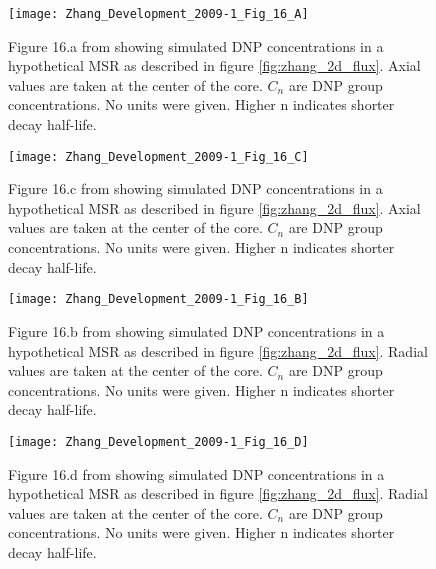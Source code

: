 \documentclass[review]{elsarticle}
\begin{document}
\begin{figure}[h]
   \centering
   \texttt{[image: Zhang\_Development\_2009-1\_Fig\_16\_A]}
   \caption{Figure 16.a from \cite{zhang_development_2009-1} showing simulated DNP concentrations
               in a hypothetical MSR as described in figure \ref{fig:zhang_2d_flux}.
               Axial
               values are taken at the center of the core. $C_{n}$ are DNP
               group concentrations. No units were given. Higher n indicates
               shorter decay half-life.}
   \label{fig:zhang_axial_velocity_dnp_1}
\end{figure}

\begin{figure}[h]
   \centering
   \texttt{[image: Zhang\_Development\_2009-1\_Fig\_16\_C]}
   \caption{Figure 16.c from \cite{zhang_development_2009-1} showing simulated DNP concentrations
               in a hypothetical MSR as described in figure \ref{fig:zhang_2d_flux}.
               Axial
               values are taken at the center of the core. $C_{n}$ are DNP
               group concentrations. No units were given. Higher n indicates
               shorter decay half-life.}
   \label{fig:zhang_axial_velocity_dnp_2}
\end{figure}

\begin{figure}[h]
   \centering
   \texttt{[image: Zhang\_Development\_2009-1\_Fig\_16\_B]}
   \caption{Figure 16.b from \cite{zhang_development_2009-1} showing simulated DNP concentrations
               in a hypothetical MSR as described in figure \ref{fig:zhang_2d_flux}.
               Radial 
               values are taken at the center of the core. $C_{n}$ are DNP
               group concentrations. No units were given. Higher n indicates
               shorter decay half-life.}
   \label{fig:zhang_radial_velocity_dnp_1}
\end{figure}

\begin{figure}[h]
   \centering
   \texttt{[image: Zhang\_Development\_2009-1\_Fig\_16\_D]}
   \caption{Figure 16.d from \cite{zhang_development_2009-1} showing simulated DNP concentrations
               in a hypothetical MSR as described in figure \ref{fig:zhang_2d_flux}.
               Radial
               values are taken at the center of the core. $C_{n}$ are DNP
               group concentrations. No units were given. Higher n indicates
               shorter decay half-life.}
   \label{fig:zhang_radial_velocity_dnp_2}
\end{figure}
\end{document}
